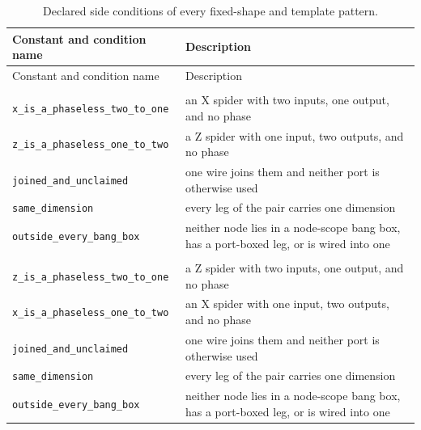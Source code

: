 \begin{xltabular}{\textwidth}{@{}>{\raggedright\arraybackslash}p{0.42\textwidth}>{\raggedright\arraybackslash}X@{}}
\caption{Declared side conditions of every fixed-shape and template pattern.}\label{tab:rewriting-declared}\\
\toprule
Constant and condition name & Description \\
\endfirsthead
\toprule
Constant and condition name & Description \\
\endhead
{}\\
\quad\texttt{x\_\allowbreak{}is\_\allowbreak{}a\_\allowbreak{}phaseless\_\allowbreak{}two\_\allowbreak{}to\_\allowbreak{}one} & an X spider with two inputs, one output, and no phase \\
\quad\texttt{z\_\allowbreak{}is\_\allowbreak{}a\_\allowbreak{}phaseless\_\allowbreak{}one\_\allowbreak{}to\_\allowbreak{}two} & a Z spider with one input, two outputs, and no phase \\
\quad\texttt{joined\_\allowbreak{}and\_\allowbreak{}unclaimed} & one wire joins them and neither port is otherwise used \\
\quad\texttt{same\_\allowbreak{}dimension} & every leg of the pair carries one dimension \\
\quad\texttt{outside\_\allowbreak{}every\_\allowbreak{}bang\_\allowbreak{}box} & neither node lies in a node-scope bang box, has a port-boxed leg, or is wired into one \\
\midrule
{}\\
\quad\texttt{z\_\allowbreak{}is\_\allowbreak{}a\_\allowbreak{}phaseless\_\allowbreak{}two\_\allowbreak{}to\_\allowbreak{}one} & a Z spider with two inputs, one output, and no phase \\
\quad\texttt{x\_\allowbreak{}is\_\allowbreak{}a\_\allowbreak{}phaseless\_\allowbreak{}one\_\allowbreak{}to\_\allowbreak{}two} & an X spider with one input, two outputs, and no phase \\
\quad\texttt{joined\_\allowbreak{}and\_\allowbreak{}unclaimed} & one wire joins them and neither port is otherwise used \\
\quad\texttt{same\_\allowbreak{}dimension} & every leg of the pair carries one dimension \\
\quad\texttt{outside\_\allowbreak{}every\_\allowbreak{}bang\_\allowbreak{}box} & neither node lies in a node-scope bang box, has a port-boxed leg, or is wired into one \\

\end{xltabular}
